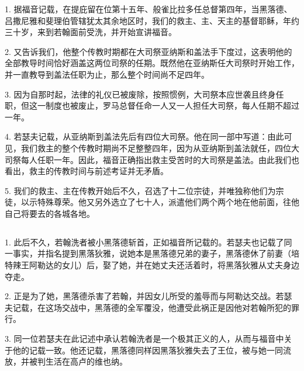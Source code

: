 1. 据福音记载，在提庇留在位第十五年、般雀比拉多任总督第四年，当黑落德、吕撒尼雅和斐理伯管辖犹太其余地区时，我们的救主、主、天主的基督耶稣，年约三十岁，来到若翰面前受洗，并开始宣讲福音。\par

2. 又告诉我们，他整个传教时期都在大司祭亚纳斯和盖法手下度过，这表明他的全部教导时间恰好涵盖这两位司祭的任期。既然他在亚纳斯任大司祭时开始工作，并一直教导到盖法任职为止，那么整个时间尚不足四年。\par

3. 因为自那时起，法律的礼仪已被废除，按照惯例，大司祭本应世袭且终身任职，但这一制度也被废止，罗马总督任命一人又一人担任大司祭，每人任期不超过一年。\par

4. 若瑟夫记载，从亚纳斯到盖法先后有四位大司祭。他在同一部中写道：由此可见，我们救主的整个传教时期尚不足整整四年，因为从亚纳斯到盖法就任，四位大司祭每人任职一年。因此，福音正确指出救主受苦时的大司祭是盖法。由此我们也看出，救主的传教时间与前述考证并无矛盾。\par

5. 我们的救主、主在传教开始后不久，召选了十二位宗徒，并唯独称他们为宗徒，以示特殊尊荣。他又另外选立了七十人，派遣他们两个两个地在他前面，往他自己将要去的各城各地。\par


\subsection{}

1. 此后不久，若翰洗者被小黑落德斩首，正如福音所记载的。若瑟夫也记载了同一事实，并指名提到黑落狄雅，说她本是黑落德兄弟的妻子，黑落德休了前妻（培特辣王阿勒达的女儿）后，娶了她，并在她丈夫还活着时，将黑落狄雅从丈夫身边夺走。\par

2. 正是为了她，黑落德杀害了若翰，并因女儿所受的羞辱而与阿勒达交战。若瑟夫记载，在这场交战中，黑落德的全军覆没，他遭受此祸正是因他对若翰所犯的罪行。\par

3. 同一位若瑟夫在此记述中承认若翰洗者是一个极其正义的人，从而与福音中关于他的记载一致。他还记载，黑落德同样因黑落狄雅失去了王位，被与她一同流放，并被判生活在高卢的维也纳。\par


